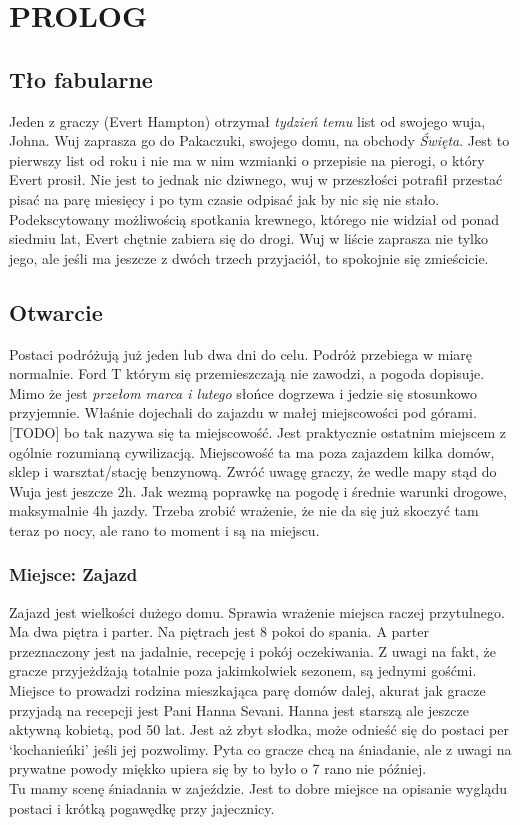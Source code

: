\documentclass[ms,a4paper]{memoir}
\newcommand{\RED}[1]{\textcolor{red!50!black}{\MakeUppercase{#1}}}
\begin{document}
\chapter{\RED{Prolog}}
\section{Tło fabularne}
Jeden z graczy (Evert Hampton) otrzymał \emph{tydzień temu} list od swojego wuja, Johna.
Wuj zaprasza go do Pakaczuki, swojego domu, na obchody \emph{Święta}.
Jest to pierwszy list od roku i nie ma w nim wzmianki o przepisie na pierogi, o który Evert prosił.
Nie jest to jednak nic dziwnego, wuj w przeszłości potrafił przestać pisać na parę miesięcy i po tym czasie odpisać jak by nic się nie stało.
Podekscytowany możliwością spotkania krewnego, którego nie widział od ponad
siedmiu lat, Evert chętnie zabiera się do drogi.
Wuj w liście zaprasza nie tylko jego, ale jeśli ma jeszcze z dwóch trzech przyjaciół, to spokojnie się zmieścicie.


\section{Otwarcie}
Postaci podróżują już jeden lub dwa dni do celu.
Podróż przebiega w miarę normalnie. Ford T którym się przemieszczają nie zawodzi, a pogoda
dopisuje. Mimo że jest \emph{przełom marca i lutego} słońce dogrzewa i jedzie się stosunkowo
przyjemnie. Właśnie dojechali do zajazdu w małej
miejscowości pod górami. [TODO] bo tak nazywa się ta miejscowość. Jest praktycznie ostatnim miejscem z ogólnie rozumianą cywilizacją.
Miejscowość ta ma poza zajazdem kilka domów, sklep i warsztat/stację benzynową.
Zwróć uwagę graczy, że wedle mapy stąd do Wuja jest jeszcze 2h.
Jak wezmą poprawkę na pogodę i średnie warunki drogowe, maksymalnie 4h jazdy.
Trzeba zrobić wrażenie, że nie da się już skoczyć tam teraz po nocy, ale rano to moment i są na miejscu.

\subsection{Miejsce: Zajazd}
Zajazd jest wielkości dużego domu.
Sprawia wrażenie miejsca raczej przytulnego.
Ma dwa piętra i parter.
Na piętrach jest 8 pokoi do spania.
A parter przeznaczony jest na jadalnie, recepcję i pokój oczekiwania.
Z uwagi na fakt, że gracze przyjeżdżają totalnie poza jakimkolwiek sezonem, są jednymi gośćmi.
Miejsce to prowadzi rodzina mieszkająca parę domów dalej, akurat jak gracze przyjadą na recepcji
jest Pani Hanna Sevani.
Hanna jest starszą ale jeszcze aktywną kobietą, pod 50 lat.
Jest aż zbyt słodka, może odnieść się do postaci per `kochanieńki' jeśli jej pozwolimy.
Pyta co gracze chcą na śniadanie, ale z uwagi na prywatne powody miękko upiera się by to było o 7 rano nie później.
\\
Tu mamy scenę śniadania w zajeździe.
Jest to dobre miejsce na opisanie wyglądu postaci i krótką pogawędkę przy jajecznicy.
\end{document}
